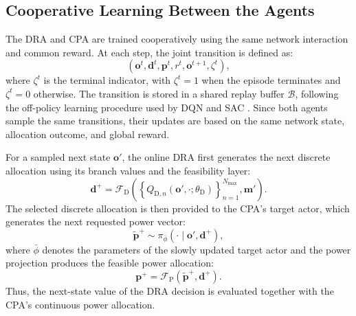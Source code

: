 \documentclass[journal]{IEEEtran}
\begin{document}
\subsection{Cooperative Learning Between the Agents}

The DRA and CPA are trained cooperatively using the same network
interaction and common reward. At each step, the joint transition is
defined as:
\begin{equation}
\left(
\mathbf{o}^{t},\mathbf{d}^{t},\mathbf{p}^{t},r^{t},
\mathbf{o}^{t+1},\zeta^{t}
\right),
\label{eq:joint_transition}
\end{equation}
where $\zeta^{t}$ is the terminal indicator, with $\zeta^{t}=1$ when
the episode terminates and $\zeta^{t}=0$ otherwise. The transition is
stored in a shared replay buffer $\mathcal{B}$, following the
off-policy learning procedure used by DQN and SAC
\cite{Mnih2015DQN,Haarnoja2018SAC}. Since both agents sample the same
transitions, their updates are based on the same network state,
allocation outcome, and global reward.

For a sampled next state $\mathbf{o}'$, the online DRA first generates
the next discrete allocation using its branch values and the
feasibility layer:
\begin{equation}
\mathbf{d}^{+}
=
\mathcal{F}_{\mathrm{D}}
\left(
\left\{
Q_{\mathrm{D},n}
(\mathbf{o}',\cdot;\theta_{\mathrm{D}})
\right\}_{n=1}^{N_{\max}},
\mathbf{m}'
\right).
\label{eq:next_discrete_action}
\end{equation}
The selected discrete allocation is then provided to the
CPA's target actor, which generates the next requested
power vector:
\begin{equation}
\widetilde{\mathbf{p}}^{+}
\sim
\pi_{\bar{\phi}}
\left(
\cdot\mid\mathbf{o}',\mathbf{d}^{+}
\right),
\end{equation}
where $\bar{\phi}$ denotes the parameters of the slowly
updated target actor
and the power projection produces the feasible power allocation:
\begin{equation}
\mathbf{p}^{+}
=
\mathcal{F}_{\mathrm{P}}
\left(
\widetilde{\mathbf{p}}^{+},
\mathbf{d}^{+}
\right).
\label{eq:next_projected_power}
\end{equation}
Thus, the next-state value of the DRA decision is evaluated together
with the CPA's continuous power allocation.
\end{document}
